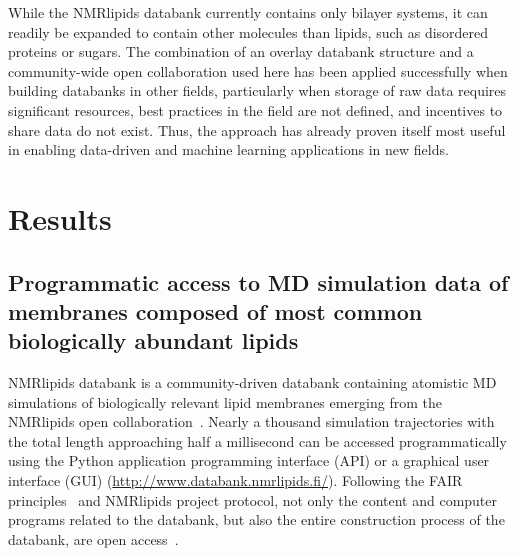 \documentclass[fleqn,10pt]{wlscirep}
\begin{document}
While the NMRlipids databank currently contains only bilayer systems, it can readily be expanded to contain other molecules than lipids, such as disordered proteins or sugars. 
The combination of an overlay databank structure and a community-wide open collaboration used here has been applied successfully when building databanks in other fields,  
particularly when storage of raw data requires significant resources, best practices in the field are not defined, and incentives to share data do not exist.
Thus, the approach has already proven itself most useful in enabling data-driven and machine learning applications in new fields. 




\section{Results}

\subsection{Programmatic access to MD simulation data of membranes composed of most common biologically abundant lipids}
NMRlipids databank is a community-driven databank containing atomistic MD simulations of biologically relevant lipid membranes emerging from the NMRlipids open collaboration~\cite{botan15,ollila16,catte16,antila19,bacle21}. Nearly a thousand simulation trajectories with the total length approaching half a millisecond can be accessed programmatically using the Python application programming interface (API) or a graphical user interface (GUI) (\url{http://www.databank.nmrlipids.fi/}). 
Following the FAIR principles~\cite{wilkinson16} and NMRlipids project protocol, not only the content and computer programs related to the databank, but also the entire construction process of the databank, are open access~\cite{botan15}. 
\end{document}
